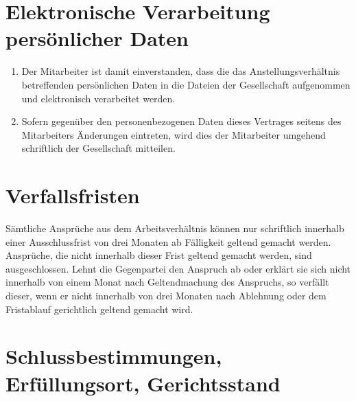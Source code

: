 \documentclass[twoside,a4paper]{scrreprt}
\begin{document}
\newpage
\section{Elektronische Verarbeitung persönlicher Daten}

\centerline{ }
\begin{enumerate}[label=(\alph*)]
	\item Der Mitarbeiter ist damit einverstanden, dass die das Anstellungsverhältnis betreffenden persönlichen Daten in die Dateien der Gesellschaft aufgenommen und elektronisch verarbeitet werden.
	\item Sofern gegenüber den personenbezogenen Daten dieses Vertrages seitens des Mitarbeiters Änderungen eintreten, wird dies der Mitarbeiter umgehend schriftlich der Gesellschaft mitteilen.
\end{enumerate}

\section{Verfallsfristen}

\centerline{ }
Sämtliche Ansprüche aus dem Arbeitsverhältnis können nur schriftlich innerhalb einer Ausschlussfrist von drei Monaten ab Fälligkeit geltend gemacht werden. Ansprüche, die nicht innerhalb dieser Frist geltend gemacht werden, sind ausgeschlossen. Lehnt die Gegenpartei den Anspruch ab oder erklärt sie sich nicht innerhalb von einem Monat nach Geltendmachung des Anspruchs, so verfällt dieser, wenn er nicht innerhalb von drei Monaten nach Ablehnung oder dem Fristablauf gerichtlich geltend gemacht wird.

\section{Schlussbestimmungen, Erfüllungsort, Gerichtsstand}
\end{document}
